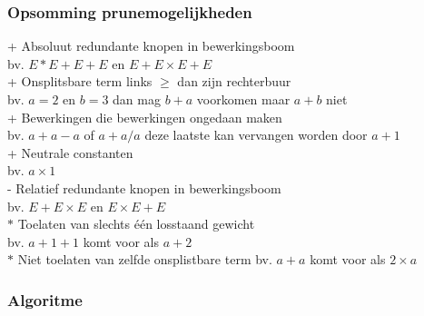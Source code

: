 \documentclass[Main.tex]{subfiles}
\begin{document}
\subsubsection*{Opsomming prunemogelijkheden}
+ Absoluut redundante knopen in bewerkingsboom\\
	bv. $E \ast E+E+E$ en $E+E \times E+E$\\
+ Onsplitsbare term %
links $\geq$ dan zijn rechterbuur\\
	bv. $a=2$ en $b=3$ dan mag $b+a$ voorkomen maar $a+b$ niet\\
+ Bewerkingen die bewerkingen ongedaan maken\\
	bv. $a+a-a$ of $a+a/a$ deze laatste kan vervangen worden door $a+1$\\
+ Neutrale constanten\\
	bv. $a \times 1$\\
- Relatief redundante knopen in bewerkingsboom\\
	bv. $E+E \times E$ en $E \times E+E$\\
$\ast$ Toelaten van slechts één losstaand gewicht\\
	bv. $a+1+1$ komt voor als $a+2$\\
$\ast$ Niet toelaten van zelfde onsplistbare term %
	bv. $a+a$ komt voor als $2 \times a$
\subsubsection*{Algoritme}
\end{document}

